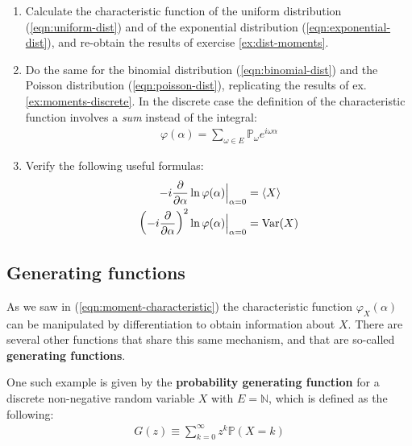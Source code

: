 \documentclass[../../main.tex]{subfiles}
\begin{document}
\begin{exo}
    \begin{enumerate}[label=\alph*.]
        \item Calculate the characteristic function of the uniform distribution (\ref{eqn:uniform-dist}) and of the exponential distribution (\ref{eqn:exponential-dist}), and re-obtain the results of exercise \ref{ex:dist-moments}.
        \item Do the same for the binomial distribution (\ref{eqn:binomial-dist}) and the Poisson distribution (\ref{eqn:poisson-dist}), replicating the results of ex. \ref{ex:moments-discrete}. In the discrete case the definition of the characteristic function involves a \textit{sum} instead of the integral:
        \begin{align*}
            \varphi(\alpha) = \sum_{\omega \in E} \mathbb{P}_\omega e^{i \omega \alpha}
        \end{align*} 
        \item Verify the following useful formulas:
        \begin{subequations}
            \begin{align}\label{eqn:f1}
                -i\pdv{\alpha} \ln\varphi(\alpha) \Big|_{\alpha = 0} &= \langle X \rangle\\
                \left(-i\pdv{\alpha}\right)^2 \ln\varphi(\alpha) \Big|_{\alpha = 0} &= \operatorname{Var}(X) \label{eqn:f2}
            \end{align}
        \end{subequations}
    \end{enumerate}
    
\end{exo}

\subsection{Generating functions}
As we saw in (\ref{eqn:moment-characteristic}) the characteristic function $\varphi_X(\alpha)$ can be manipulated by differentiation to obtain information about $X$. There are several other functions that share this same mechanism, and that are so-called \textbf{generating functions}. 

\medskip

One such example is given by the \textbf{probability generating function} for a discrete non-negative random variable $X$ with $E = \mathbb{N}$, which is defined as the following:
\begin{align}\label{eqn:pgenerating}
    G(z) \equiv \sum_{k=0}^{\infty} z^k \mathbb{P}(X=k)
\end{align} 
\end{document}
